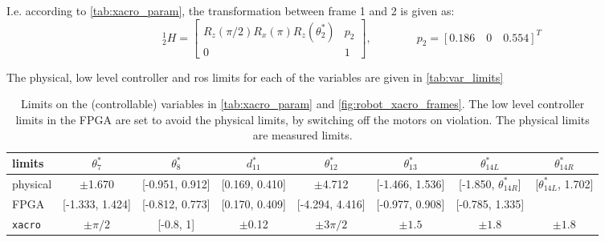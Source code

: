 I.e. according to \autoref{tab:xacro_param}, the transformation between frame 1 and 2 is given as:
\begin{equation}
^1_2H = 
\begin{bmatrix}
R_z(\pi/2)R_x(\pi)R_z(\theta_2^*) & p_2\\
0 & 1
\end{bmatrix}, \qquad\qquad
p_2 = [0.186 \quad 0 \quad 0.554]^T
\end{equation}

The physical, low level controller and \gls{ros} limits for each of the variables are given in \autoref{tab:var_limits}


\begin{table}[htbp]
\small
\hspace{-10mm}
\begin{tabular}{l | ccccccc}
limits & $\theta_7^*$ & $\theta_8^*$ & $d_{11}^*$ & $\theta_{12}^*$ & $\theta_{13}^*$ & $\theta_{14L}^*$ & $\theta_{14R}^*$ \\\hline
physical & $\pm$1.670 & [-0.951, 0.912] & [0.169, 0.410] & $\pm$4.712 & [-1.466, 1.536] & [-1.850, $\theta_{14R}^*$] & [$\theta_{14L}^*$, 1.702] \\
FPGA & [-1.333, 1.424] & [-0.812, 0.773] & [0.170, 0.409] & [-4.294, 4.416] & [-0.977, 0.908] & [-0.785, 1.335] & \\
\texttt{xacro} & $\pm\pi/2$ & [-0.8, 1] & $\pm$0.12 & $\pm3\pi/2$ & $\pm 1.5$ & $\pm 1.8$ & $\pm 1.8$
\end{tabular}
\normalsize
\caption{Limits on the (controllable) variables in \autoref{tab:xacro_param} and \autoref{fig:robot_xacro_frames}. The low level controller limits in the FPGA are set to avoid the physical limits, by switching off the motors on violation. The physical limits are measured limits.}
\label{tab:var_limits}
\end{table}

